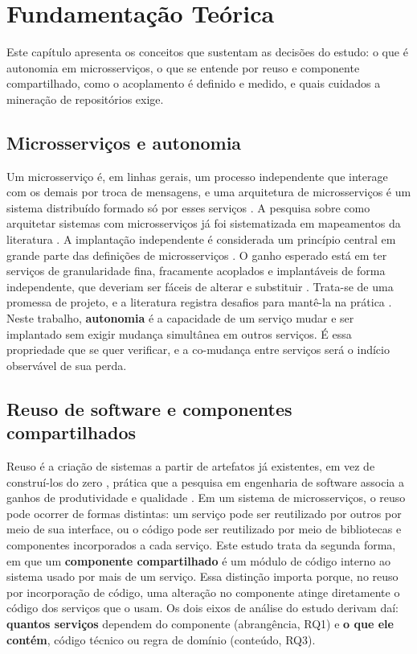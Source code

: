 \chapter{Fundamentação Teórica}
\label{cap:fundamentacao-teorica}

Este capítulo apresenta os conceitos que sustentam as decisões do estudo: o que é autonomia em microsserviços, o que se entende por reuso e componente compartilhado, como o acoplamento é definido e medido, e quais cuidados a mineração de repositórios exige.

\section{Microsserviços e autonomia}

Um microsserviço é, em linhas gerais, um processo independente que interage com os demais por troca de mensagens, e uma arquitetura de microsserviços é um sistema distribuído formado só por esses serviços \cite{dragoni2017}. A pesquisa sobre como arquitetar sistemas com microsserviços já foi sistematizada em mapeamentos da literatura \cite{difrancesco2019}. A implantação independente é considerada um princípio central em grande parte das definições de microsserviços \cite{neri2019}. O ganho esperado está em ter serviços de granularidade fina, fracamente acoplados e implantáveis de forma independente, que deveriam ser fáceis de alterar e substituir \cite{bogner2021}. Trata-se de uma promessa de projeto, e a literatura registra desafios para mantê-la na prática \cite{jamshidi2018}. Neste trabalho, \textbf{autonomia} é a capacidade de um serviço mudar e ser implantado sem exigir mudança simultânea em outros serviços. É essa propriedade que se quer verificar, e a co-mudança entre serviços será o indício observável de sua perda.

\section{Reuso de software e componentes compartilhados}

Reuso é a criação de sistemas a partir de artefatos já existentes, em vez de construí-los do zero \cite{krueger1992}, prática que a pesquisa em engenharia de software associa a ganhos de produtividade e qualidade \cite{frakes2005}. Em um sistema de microsserviços, o reuso pode ocorrer de formas distintas: um serviço pode ser reutilizado por outros por meio de sua interface, ou o código pode ser reutilizado por meio de bibliotecas e componentes incorporados a cada serviço. Este estudo trata da segunda forma, em que um \textbf{componente compartilhado} é um módulo de código interno ao sistema usado por mais de um serviço. Essa distinção importa porque, no reuso por incorporação de código, uma alteração no componente atinge diretamente o código dos serviços que o usam. Os dois eixos de análise do estudo derivam daí: \textbf{quantos serviços} dependem do componente (abrangência, RQ1) e \textbf{o que ele contém}, código técnico ou regra de domínio (conteúdo, RQ3).

